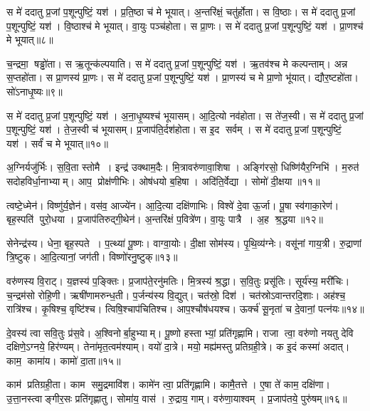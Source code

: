 स मे॑ ददातु प्र॒जां प॒शून्पुष्टिं॒ यश॑। प्र॒ति॒ष्ठा च॑ मे भूयात्। अ॒न्तरि॑क्षं॒ चतु॑र्\mbox{}होता। स वि॒ष्ठाः। स मे॑ ददातु प्र॒जां प॒शून्पुष्टिं॒ यश॑। वि॒ष्ठाश्च॑ मे भूयात्। वा॒युः पञ्च॑होता। स प्रा॒णः। स मे॑ ददातु प्र॒जां प॒शून्पुष्टिं॒ यश॑। प्रा॒णश्च॑ मे भूयात्॥८॥

च॒न्द्रमा॒ षड्ढो॑ता। स ऋ॒तून्क॑ल्पयाति। स मे॑ ददातु प्र॒जां प॒शून्पुष्टिं॒ यश॑। ऋ॒तव॑श्च मे कल्पन्ताम्। अन्न स॒प्तहो॑ता। स प्रा॒णस्य॑ प्रा॒णः। स मे॑ ददातु प्र॒जां प॒शून्पुष्टिं॒ यश॑। प्रा॒णस्य॑ च मे प्रा॒णो भू॑यात्। द्यौर॒ष्टहो॑ता। सो॑ऽनाधृ॒ष्यः॥९॥

स मे॑ ददातु प्र॒जां प॒शून्पुष्टिं॒ यश॑। अ॒ना॒धृ॒ष्यश्च॑ भूयासम्। आ॒दि॒त्यो नव॑होता। स ते॑ज॒स्वी। स मे॑ ददातु प्र॒जां प॒शून्पुष्टिं॒ यश॑। ते॒ज॒स्वी च॑ भूयासम्। प्र॒जाप॑ति॒र्दश॑होता। स इ॒द सर्वम्। स मे॑ ददातु प्र॒जां प॒शून्पुष्टिं॒ यश॑। सर्वं॑ च मे भूयात्॥१०॥
\anuvakamend[प्र॒ति॒ष्ठा प्रा॒णश्च॑ मे भूयादनाधृ॒ष्यः सर्वं॑ च मे भूयात्]

अ॒ग्निर्यजु॑र्भिः। स॒वि॒ता स्तोमै। इन्द्र॑ उक्थाम॒दैः। मि॒त्रावरु॑णा\-वा॒शिषा। अङ्गि॑रसो॒ धिष्णि॑यैर॒ग्निभि॑। म॒रुत॑ सदोहविर्धा॒नाभ्याम्। आप॒ प्रोक्ष॑णीभिः। ओष॑धयो ब॒\ar{}हिषा। अदि॑ति॒र्वेद्या। सोमो॑ दी॒क्षया॥११॥

त्वष्टे॒ध्मेन॑। विष्णु॑र्\mbox{}य॒ज्ञेन॑। वस॑व॒ आज्ये॑न। आ॒दि॒त्या दक्षि॑णाभिः। विश्वे॑ दे॒वा ऊ॒र्जा। पू॒षा स्व॑गाका॒रेण॑। बृह॒स्पति॑ पुरो॒धया। प्र॒जाप॑तिरुद्गी॒थेन॑। अ॒न्तरि॑क्षं प॒वित्रे॑ण। वा॒युः पात्रै। अ॒ह श्र॒द्धया॥१२॥
\anuvakamend[दी॒क्षया॒ पात्रै॒रेकं॑ च]

सेनेन्द्र॑स्य। धेना॒ बृह॒स्पते। प॒त्थ्या॑ पू॒ष्णः। वाग्वा॒योः। दी॒क्षा सोम॑स्य। पृ॒थि॒व्य॑ग्नेः। वसू॑नां  गाय॒त्री। रु॒द्राणां त्रि॒ष्टुक्। आ॒दि॒त्यानां॒ जग॑ती। विष्णो॑रनु॒ष्टुक्॥१३॥%

वरु॑णस्य वि॒राट्। य॒ज्ञस्य॑ प॒ङ्क्तिः। प्र॒जाप॑ते॒रनु॑मतिः। मि॒त्रस्य॑ श्र॒द्धा। स॒वि॒तुः प्रसू॑तिः। सूर्य॑स्य॒ मरी॑चिः। च॒न्द्रम॑सो रोहि॒णी। ऋषी॑णामरुन्ध॒ती। प॒र्जन्य॑स्य वि॒द्युत्। चत॑स्रो॒ दिश॑। चत॑स्रोऽवान्तरदि॒शाः। अह॑श्च॒ रात्रि॑श्च। कृ॒षिश्च॒ वृष्टि॑श्च। त्विषि॒श्चाप॑चितिश्च। आप॒श्चौष॑धयश्च। ऊर्क्च॑ सू॒नृता॑ च दे॒वानां॒ पत्न॑यः॥१४॥%
\anuvakamend[अ॒नु॒ष्टुग्दिश॒ षट्च॑]

दे॒वस्य॑ त्वा सवि॒तुः प्र॑स॒वे। अ॒श्विनोर्बा॒हुभ्याम्। पू॒ष्णो हस्ताभ्यां॒ प्रति॑गृह्णामि। राजा त्वा॒ वरु॑णो नयतु देवि दक्षिणे॒ऽग्नये॒ हिर॑ण्यम्। तेना॑मृत॒त्वम॑श्याम्। वयो॑ दा॒त्रे। मयो॒ मह्य॑मस्तु प्रतिग्रही॒त्रे। क इ॒दं कस्मा॑ अदात्। काम॒ कामा॑य। कामो॑ दा॒ता॥१५॥

काम॑ प्रतिग्रही॒ता। काम समु॒द्रमावि॑श। कामे॑न त्वा॒ प्रति॑गृह्णामि। कामै॒तत्ते। ए॒षा ते॑ काम॒ दक्षि॑णा। उ॒त्ता॒नस्त्वाङ्गीर॒सः प्रति॑गृह्णातु। सोमा॑य॒ वास॑। रु॒द्राय॒ गाम्। वरु॑णा॒याश्वम्। प्र॒जाप॑तये॒ पुरु॑षम्॥१६॥%


